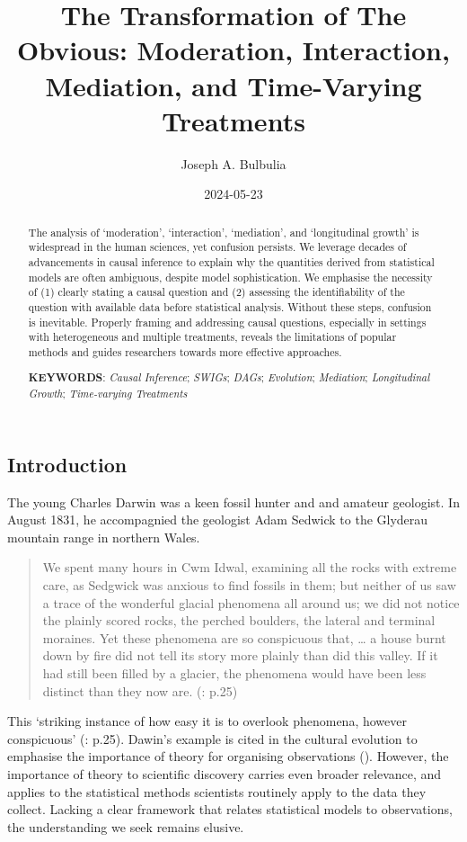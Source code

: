 \documentclass[
  single column]{article}
\title{The Transformation of The Obvious: Moderation, Interaction,
Mediation, and Time-Varying Treatments}
\author{Joseph A. Bulbulia}
\affil{%
             \small{     Victoria University of Wellington, New Zealand
          ORCID \textcolor[HTML]{A6CE39}{\aiOrcid} ~0000-0002-5861-2056 }
              }
\date{2024-05-23}
\begin{document}
\maketitle
\begin{abstract}
The analysis of `moderation', `interaction', `mediation', and
`longitudinal growth' is widespread in the human sciences, yet confusion
persists. We leverage decades of advancements in causal inference to
explain why the quantities derived from statistical models are often
ambiguous, despite model sophistication. We emphasise the necessity of
(1) clearly stating a causal question and (2) assessing the
identifiability of the question with available data before statistical
analysis. Without these steps, confusion is inevitable. Properly framing
and addressing causal questions, especially in settings with
heterogeneous and multiple treatments, reveals the limitations of
popular methods and guides researchers towards more effective
approaches.

\textbf{KEYWORDS}: \emph{Causal Inference}; \emph{SWIGs}; \emph{DAGs};
\emph{Evolution}; \emph{Mediation}; \emph{Longitudinal Growth};
\emph{Time-varying Treatments}
\end{abstract}

\subsection{Introduction}\label{introduction}

The young Charles Darwin was a keen fossil hunter and and amateur
geologist. In August 1831, he accompagnied the geologist Adam Sedwick to
the Glyderau mountain range in northern Wales.

\begin{quote}
We spent many hours in Cwm Idwal, examining all the rocks with extreme
care, as Sedgwick was anxious to find fossils in them; but neither of us
saw a trace of the wonderful glacial phenomena all around us; we did not
notice the plainly scored rocks, the perched boulders, the lateral and
terminal moraines. Yet these phenomena are so conspicuous that, \ldots{}
a house burnt down by fire did not tell its story more plainly than did
this valley. If it had still been filled by a glacier, the phenomena
would have been less distinct than they now are.
(: p.25)
\end{quote}

This `striking instance of how easy it is to overlook phenomena, however
conspicuous' (: p.25). Dawin's
example is cited in the cultural evolution to emphasise the importance
of theory for organising observations
(). However, the
importance of theory to scientific discovery carries even broader
relevance, and applies to the statistical methods scientists routinely
apply to the data they collect. Lacking a clear framework that relates
statistical models to observations, the understanding we seek remains
elusive.
\end{document}
